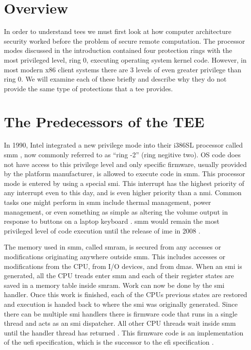 \section{Overview}
In order to understand \glspl{tee} we must first look at how computer architecture security worked before the problem of secure remote computation. The processor modes discussed in the introduction contained four protection rings with the most privileged level, ring 0, executing operating system kernel code. However, in most modern x86 client systems there are 3 levels of even greater privilege than ring 0. We will examine each of these briefly and describe why they do not provide the same type of protections that a \gls{tee} provides.

\section{The Predecessors of the TEE}

In 1990, Intel integrated a new privilege mode into their i386SL processor called \gls{smm} \cite{zimmer2005hardened}, now commonly referred to as ``ring -2'' (ring negitive two).  OS code does not have access to this privilege level and only specific firmware, usually provided by the platform manufacturer, is allowed to execute code in \gls{smm}. This processor mode is entered by using a special \gls{smi}. This interrupt has the highest priority of any interrupt even to this day, and is even higher priority than a \gls{nmi}. Common tasks one might perform in \gls{smm} include thermal management, power management, or even something as simple as altering the volume output in response to buttons on a laptop keyboard \cite{yao2009system}. \gls{smm} would remain the most privileged level of code execution until the release of \gls{ime} in 2008 \cite{eldar2008configuring}.

The memory used in \gls{smm}, called \gls{smram}, is secured from any accesses or modifications originating anywhere outside \gls{smm}. This includes accesses or modifications from the CPU, from I/O devices, and from \glspl{dma}. When an \gls{smi} is generated, all the CPU treads enter \gls{smm} and each of their register states are saved in a memory table inside \gls{smram}. Work can now be done by the \gls{smi} handler. Once this work is finished, each of the CPUs previous states are restored and execution is handed back to where the \gls{smi} was originally generated. Since there can be multiple \gls{smi} handlers there is firmware code that runs in a single thread and acts as an \gls{smi} dispatcher. All other CPU threads wait inside \gls{smm} until the handler thread has returned \cite{delgado2013}. This firmware code is an implementation of the \gls{uefi} specification, which is the successor to the \gls{efi} specification \cite{beyondBIOS}.

